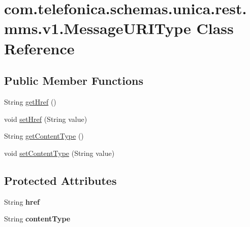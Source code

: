\hypertarget{classcom_1_1telefonica_1_1schemas_1_1unica_1_1rest_1_1mms_1_1v1_1_1MessageURIType}{
\section{com.telefonica.schemas.unica.rest.mms.v1.MessageURIType Class Reference}
\label{classcom_1_1telefonica_1_1schemas_1_1unica_1_1rest_1_1mms_1_1v1_1_1MessageURIType}
}
\subsection*{Public Member Functions}
\begin{DoxyCompactItemize}
\item 
String \hyperlink{classcom_1_1telefonica_1_1schemas_1_1unica_1_1rest_1_1mms_1_1v1_1_1MessageURIType_ae2a6befd7145ee85027f0561f064706c}{getHref} ()
\item 
void \hyperlink{classcom_1_1telefonica_1_1schemas_1_1unica_1_1rest_1_1mms_1_1v1_1_1MessageURIType_a8365bdca0c9d22ad5c0ef7ea4ccda0d5}{setHref} (String value)
\item 
String \hyperlink{classcom_1_1telefonica_1_1schemas_1_1unica_1_1rest_1_1mms_1_1v1_1_1MessageURIType_a8e07b0e64493dc1544156e53cda93f0f}{getContentType} ()
\item 
void \hyperlink{classcom_1_1telefonica_1_1schemas_1_1unica_1_1rest_1_1mms_1_1v1_1_1MessageURIType_a5d0f7568497aa6eab345a08922e23d32}{setContentType} (String value)
\end{DoxyCompactItemize}
\subsection*{Protected Attributes}
\begin{DoxyCompactItemize}
\item 
\hypertarget{classcom_1_1telefonica_1_1schemas_1_1unica_1_1rest_1_1mms_1_1v1_1_1MessageURIType_ad60bd729902e4f5d5739d199496f2192}{
String {\bfseries href}}
\label{classcom_1_1telefonica_1_1schemas_1_1unica_1_1rest_1_1mms_1_1v1_1_1MessageURIType_ad60bd729902e4f5d5739d199496f2192}

\item 
\hypertarget{classcom_1_1telefonica_1_1schemas_1_1unica_1_1rest_1_1mms_1_1v1_1_1MessageURIType_a4ac23d56a090927bb94b8e0cc1a538ec}{
String {\bfseries contentType}}
\label{classcom_1_1telefonica_1_1schemas_1_1unica_1_1rest_1_1mms_1_1v1_1_1MessageURIType_a4ac23d56a090927bb94b8e0cc1a538ec}

\end{DoxyCompactItemize}


